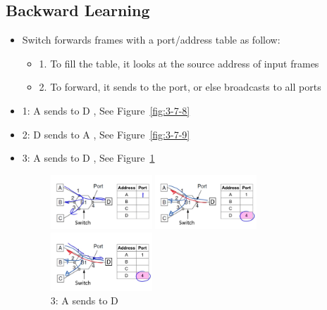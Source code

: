 \documentclass[12pt]{ctexart}   %
\begin{document}
	\subsection{Backward Learning}
	\begin{itemize}
		\item Switch forwards frames with a port/address table as follow:
		\begin{itemize}
			\item {\color{blue} 1.} To fill the table, it looks at the source address of input frames
			\item {\color{blue} 2.} To forward, it sends to the port, or else broadcasts to all ports
		\end{itemize}
		
		\item 1: A sends to D  , See Figure~\ref{fig:3-7-8}
		\item 2: D sends to A  , See Figure~\ref{fig:3-7-9}
		\item 3: A sends to D , See Figure~\ref{fig:3-7-10}
		
		\begin{figure}
			\begin{minipage}[t]{0.3\linewidth}
				\centering
				\includegraphics[width=1.5in]{images/3-7-8}
				\caption{ 1: A sends to D }
				\label{fig:3-7-8}
			\end{minipage}
			\begin{minipage}[t]{0.3\linewidth}
				\centering
				\includegraphics[width=1.5in]{images/3-7-9}
				\caption{2: D sends to A }
				\label{fig:3-7-9}
			\end{minipage}
			\begin{minipage}[t]{0.3\linewidth}
				\centering
				\includegraphics[width=1.5in]{images/3-7-10}
				\caption{3: A sends to D}
				\label{fig:3-7-10}
			\end{minipage}
		\end{figure}
	\end{itemize}
	
\end{document}
